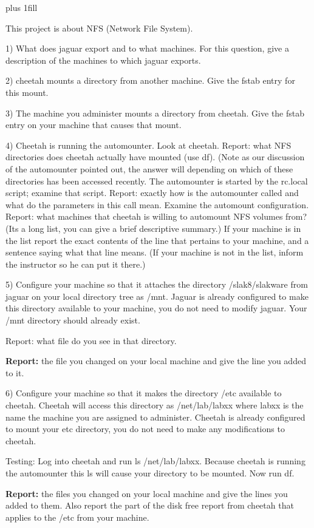 
\rightskip=0pt plus 1fill

\parindent 0pt

This project is about NFS (Network File System).

1) What does jaguar export and to what machines.
For this question, give a description of the machines to which
jaguar exports.

2) cheetah mounts a directory from another machine.
Give the fstab entry for this mount.

3) The machine you administer mounts a directory from cheetah.
Give the fstab entry on your machine that causes that mount.

4) Cheetah is running the automounter.
Look at cheetah. 
Report: what NFS directories does cheetah actually have mounted 
(use {\ltt{}df}).
(Note as our discussion of the automounter pointed out, the answer will
depending on which of these directories has been accessed recently.
The automounter is started by the {\ltt{}rc.local} script;
examine that script.
Report: exactly how is the automounter called and
what do the parameters in this call mean.
Examine the automount configuration.
Report: what machines that cheetah is willing to automount NFS volumes from?
(Its a long list, you can give a brief descriptive summary.)
If your machine is in the list report the exact contents of the
line that pertains to your machine, and a sentence saying what that
line means.
(If your machine is not in the list, inform the instructor so he can put it
there.)

5) Configure your machine so that it attaches the directory
{\ltt{}/slak8/slakware} from jaguar on your local directory tree
as {\ltt{}/mnt}.
Jaguar is already configured to make this directory available to your
machine, you do not need to modify jaguar.
Your {\ltt{}/mnt} directory should already exist.

Report: what file do you see in that directory.

{\bf Report:} the file you changed on your local machine and give the line
you added to it.

6) Configure your machine so that it makes the directory
{\ltt{}/etc} available to cheetah.
Cheetah will access this directory as {\ltt{}/net/lab/labxx} where {\ltt{}labxx}
is the name the machine you are assigned to administer.
Cheetah is already configured to mount your {\ltt{}etc} directory,
you do not need to make any modifications to cheetah.

Testing: Log into cheetah and run {\ltt{}ls /net/lab/labxx}.
Because cheetah is running the automounter
this {\ltt{}ls} will cause your directory to be mounted.
Now run {\ltt{}df}.

{\bf Report:} the files you changed on your local machine and give the lines 
you added to them.
Also report the part of the disk free report from cheetah that applies to 
the {\ltt{}/etc} from your machine.

\bye
